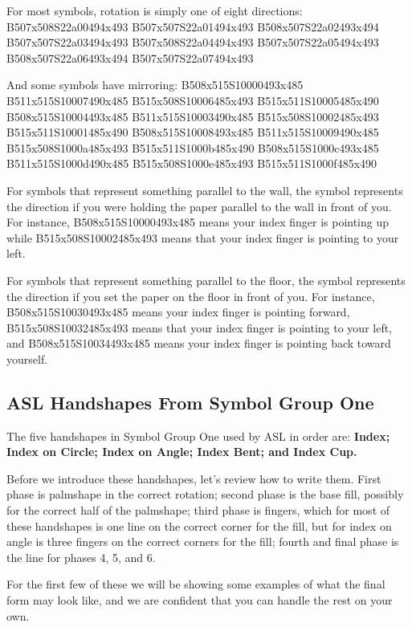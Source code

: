 \documentclass{article}
\begin{document}
For most symbols, rotation is simply one of eight directions:
B507x508S22a00494x493 B507x507S22a01494x493 B508x507S22a02493x494 B507x507S22a03494x493 B507x508S22a04494x493 B507x507S22a05494x493 B508x507S22a06493x494 B507x507S22a07494x493

And some symbols have mirroring:
B508x515S10000493x485 B511x515S10007490x485 B515x508S10006485x493 B515x511S10005485x490 B508x515S10004493x485 B511x515S10003490x485 B515x508S10002485x493 B515x511S10001485x490
B508x515S10008493x485 B511x515S10009490x485 B515x508S1000a485x493 B515x511S1000b485x490 B508x515S1000c493x485 B511x515S1000d490x485 B515x508S1000e485x493 B515x511S1000f485x490

For symbols that represent something parallel to the wall, the symbol represents the direction if you were holding the paper parallel to the wall in front of you.
For instance, {\small B508x515S10000493x485} means your index finger is pointing up while {\small B515x508S10002485x493} means that your index finger is pointing to your left.

For symbols that represent something parallel to the floor, the symbol represents the direction if you set the paper on the floor in front of you.
For instance, {\small B508x515S10030493x485} means your index finger is pointing forward, {\small B515x508S10032485x493} means that your index finger is pointing to your left, and {\small B508x515S10034493x485} means your index finger is pointing back toward yourself.

\subsection{ASL Handshapes From Symbol Group One}

The five handshapes in Symbol Group One used by ASL in order are:
{\bf
Index;
Index on Circle;
Index on Angle;
Index Bent;
and Index Cup.
}

Before we introduce these handshapes, let's review how to write them.
First phase is palmshape in the correct rotation;
second phase is the base fill, possibly for the correct half of the palmshape;
third phase is fingers, which for most of these handshapes is one line on the correct corner for the fill, but for index on angle is three fingers on the correct corners for the fill;
fourth and final phase is the line for phases 4, 5, and 6.

For the first few of these we will be showing some examples of what the final form may look like, and we are confident that you can handle the rest on your own.
\end{document}
